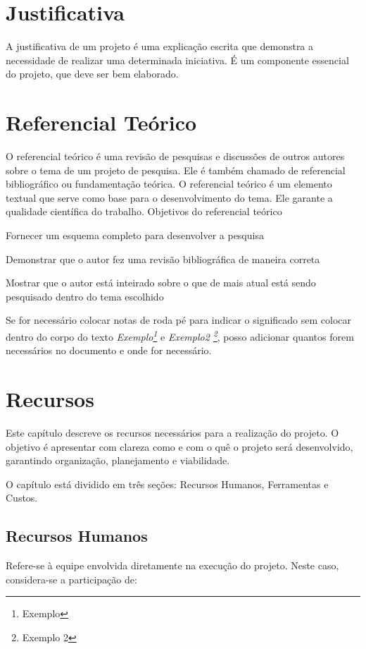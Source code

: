 \section{Justificativa}

A justificativa de um projeto é uma explicação escrita que demonstra a necessidade de realizar uma determinada iniciativa. É um componente essencial do projeto, que deve ser bem elaborado. 

\section{Referencial Teórico}

O referencial teórico é uma revisão de pesquisas e discussões de outros autores sobre o tema de um projeto de pesquisa. Ele é também chamado de referencial bibliográfico ou fundamentação teórica. 
O referencial teórico é um elemento textual que serve como base para o desenvolvimento do tema. Ele garante a qualidade científica do trabalho. 
Objetivos do referencial teórico

Fornecer um esquema completo para desenvolver a pesquisa 

Demonstrar que o autor fez uma revisão bibliográfica de maneira correta 

Mostrar que o autor está inteirado sobre o que de mais atual está sendo pesquisado dentro do tema escolhido 

Se for necessário colocar notas de roda pé para indicar o significado sem colocar dentro do corpo do texto \textit{Exemplo\footnote{Exemplo}}  e \textit{Exemplo2 \footnote{Exemplo 2}}, posso adicionar quantos forem necessários no documento e onde for necessário.


\section{Recursos}
Este capítulo descreve os recursos necessários para a realização do projeto. O objetivo é apresentar com clareza como e com o quê o projeto será desenvolvido, garantindo organização, planejamento e viabilidade.

O capítulo está dividido em três seções: Recursos Humanos, Ferramentas e Custos.

\subsection{Recursos Humanos}

Refere-se à equipe envolvida diretamente na execução do projeto. Neste caso, considera-se a participação de:

